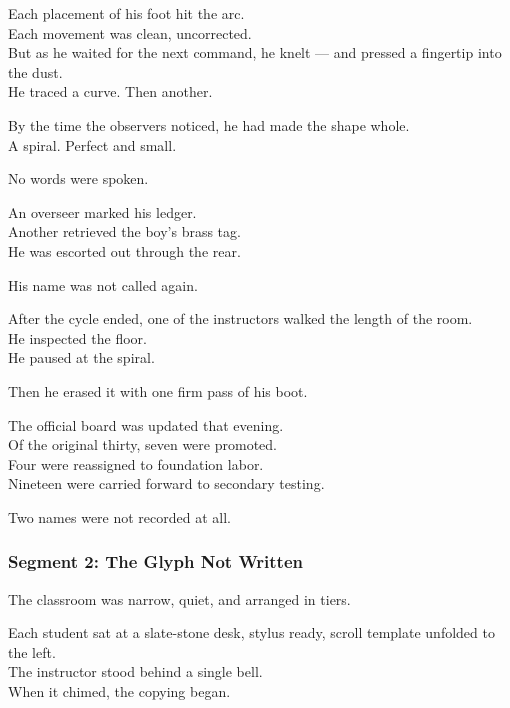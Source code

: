 \documentclass[9pt]{article}
\begin{document}
Each placement of his foot hit the arc.\\
Each movement was clean, uncorrected.\\
But as he waited for the next command, he knelt — and pressed a fingertip into the dust.\\
He traced a curve. Then another.

By the time the observers noticed, he had made the shape whole.\\
A spiral. Perfect and small.

No words were spoken.

An overseer marked his ledger.\\
Another retrieved the boy’s brass tag.\\
He was escorted out through the rear.

His name was not called again.

\vspace{1em}

After the cycle ended, one of the instructors walked the length of the room.\\
He inspected the floor.\\
He paused at the spiral.

Then he erased it with one firm pass of his boot.

\vspace{1em}

The official board was updated that evening.\\
Of the original thirty, seven were promoted.\\
Four were reassigned to foundation labor.\\
Nineteen were carried forward to secondary testing.

Two names were not recorded at all.

\newpage

\subsubsection*{Segment 2: The Glyph Not Written}

The classroom was narrow, quiet, and arranged in tiers.

Each student sat at a slate-stone desk, stylus ready, scroll template unfolded to the left.\\
The instructor stood behind a single bell.\\
When it chimed, the copying began.

\vspace{1em}
\end{document}
